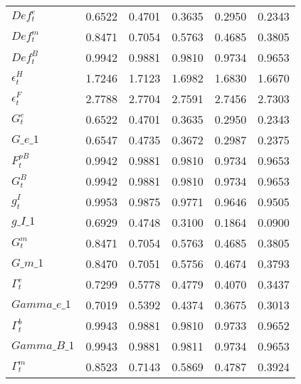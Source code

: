 \begin{center}
\begin{longtable}{lccccc}
$ Def^e_t                   $	 & 	    0.6522	 & 	    0.4701	 & 	    0.3635	 & 	    0.2950	 & 	    0.2343 \\ 
$ Def^m_t                   $	 & 	    0.8471	 & 	    0.7054	 & 	    0.5763	 & 	    0.4685	 & 	    0.3805 \\ 
$ Def^B_t                   $	 & 	    0.9942	 & 	    0.9881	 & 	    0.9810	 & 	    0.9734	 & 	    0.9653 \\ 
$ \epsilon^H_t              $	 & 	    1.7246	 & 	    1.7123	 & 	    1.6982	 & 	    1.6830	 & 	    1.6670 \\ 
$ \epsilon^F_t              $	 & 	    2.7788	 & 	    2.7704	 & 	    2.7591	 & 	    2.7456	 & 	    2.7303 \\ 
$ G^e_t                     $	 & 	    0.6522	 & 	    0.4701	 & 	    0.3635	 & 	    0.2950	 & 	    0.2343 \\ 
$G\_e\_1                    $	 & 	    0.6547	 & 	    0.4735	 & 	    0.3672	 & 	    0.2987	 & 	    0.2375 \\ 
$ F^{pB}_t                  $	 & 	    0.9942	 & 	    0.9881	 & 	    0.9810	 & 	    0.9734	 & 	    0.9653 \\ 
$ G^B_t                     $	 & 	    0.9942	 & 	    0.9881	 & 	    0.9810	 & 	    0.9734	 & 	    0.9653 \\ 
$ g^I_t                     $	 & 	    0.9953	 & 	    0.9875	 & 	    0.9771	 & 	    0.9646	 & 	    0.9505 \\ 
$g\_I\_1                    $	 & 	    0.6929	 & 	    0.4748	 & 	    0.3100	 & 	    0.1864	 & 	    0.0900 \\ 
$ G^m_t                     $	 & 	    0.8471	 & 	    0.7054	 & 	    0.5763	 & 	    0.4685	 & 	    0.3805 \\ 
$G\_m\_1                    $	 & 	    0.8470	 & 	    0.7051	 & 	    0.5756	 & 	    0.4674	 & 	    0.3793 \\ 
$ \Gamma^e_t                $	 & 	    0.7299	 & 	    0.5778	 & 	    0.4779	 & 	    0.4070	 & 	    0.3437 \\ 
$Gamma\_e\_1                $	 & 	    0.7019	 & 	    0.5392	 & 	    0.4374	 & 	    0.3675	 & 	    0.3013 \\ 
$ \Gamma^b_t                $	 & 	    0.9943	 & 	    0.9881	 & 	    0.9810	 & 	    0.9733	 & 	    0.9652 \\ 
$Gamma\_B\_1                $	 & 	    0.9943	 & 	    0.9881	 & 	    0.9811	 & 	    0.9734	 & 	    0.9653 \\ 
$ \Gamma^m_t                $	 & 	    0.8523	 & 	    0.7143	 & 	    0.5869	 & 	    0.4787	 & 	    0.3924 \\ 

\end{longtable}
\end{center}
